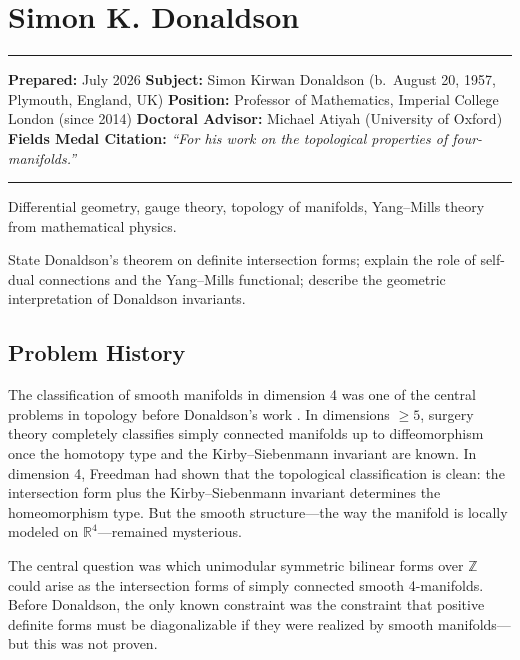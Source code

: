 \chapter{Simon K. Donaldson}\label{ch1986simondonaldson:simon-k.-donaldson-fields-medal-1986-a-comprehensive-report}

\begin{center}\rule{0.5\linewidth}{0.5pt}\end{center}

\textbf{Prepared:} July 2026 \textbf{Subject:} Simon Kirwan Donaldson (b.~August 20, 1957, Plymouth, England, UK) \textbf{Position:} Professor of Mathematics, Imperial College London (since 2014) \textbf{Doctoral Advisor:} Michael Atiyah (University of Oxford) \textbf{Fields Medal Citation:} \emph{``For his work on the topological properties of four-manifolds.''}

\begin{center}\rule{0.5\linewidth}{0.5pt}\end{center}

\begin{prereqs} Differential geometry, gauge theory, topology of manifolds, Yang--Mills theory from mathematical physics. \end{prereqs}

\begin{objectives} State Donaldson's theorem on definite intersection forms; explain the role of self-dual connections and the Yang--Mills functional; describe the geometric interpretation of Donaldson invariants. \end{objectives}

\section{Problem History}

The classification of smooth manifolds in dimension 4 was one of the central problems in topology before Donaldson's work \cite{donaldson1983}. In dimensions $\geq 5$, surgery theory completely classifies simply connected manifolds up to diffeomorphism once the homotopy type and the Kirby--Siebenmann invariant are known. In dimension 4, Freedman had shown that the topological classification is clean: the intersection form plus the Kirby--Siebenmann invariant determines the homeomorphism type. But the smooth structure---the way the manifold is locally modeled on $\mathbb{R}^4$---remained mysterious.

The central question was which unimodular symmetric bilinear forms over $\mathbb{Z}$ could arise as the intersection forms of simply connected smooth 4-manifolds. Before Donaldson, the only known constraint was the constraint that positive definite forms must be diagonalizable if they were realized by smooth manifolds---but this was not proven.

